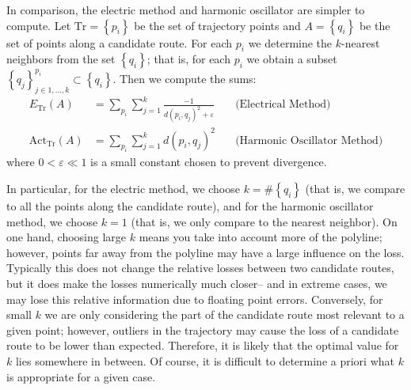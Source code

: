 \documentclass{article}
\numberwithin{equation}{section}
\theoremstyle{definition}
\newcommand{\eps}{\varepsilon} %
\begin{document}
In comparison, the electric method and harmonic oscillator are simpler to compute. Let $\textrm{Tr} = \left\{ p_i \right\}$ be the set of trajectory points and $A = \left\{q_i\right\}$ be the set of points along a candidate route. For each $p_i$ we determine the $k$-nearest neighbors from the set $\left\{q_i\right\}$; that is, for each $p_i$ we obtain a subset $\left\{q_j\right\}_{j \in 1,...,k}^{p_i} \subset \left\{ q_i \right\}$. Then we compute the sums:
\begin{align}
    E_\textrm{Tr}(A) &= \sum_{p_i} \sum_{j = 1}^k \frac{-1}{d(p_i,q_j)^2 + \eps} \quad& \text{(Electrical Method)}\\
    \textrm{Act}_\textrm{Tr} (A) &= \sum_{p_i} \sum_{j=1}^k d(p_i,q_j)^2 \quad& \text{(Harmonic Oscillator Method)}
\end{align}
where $0<\eps\ll 1$ is a small constant chosen to prevent divergence.

In particular, for the electric method, we choose $k = \# \left\{q_i\right\}$ (that is, we compare to all the points along the candidate route), and for the harmonic oscillator method, we choose $k = 1$ (that is, we only compare to the nearest neighbor). On one hand, choosing large $k$ means you take into account more of the polyline; however, points far away from the polyline may have a large influence on the loss. Typically this does not change the relative losses between two candidate routes, but it does make the losses numerically much closer-- and in extreme cases, we may lose this relative information due to floating point errors. Conversely, for small $k$ we are only considering the part of the candidate route most relevant to a given point; however, outliers in the trajectory may cause the loss of a candidate route to be lower than expected. Therefore, it is likely that the optimal value for $k$ lies somewhere in between. Of course, it is difficult to determine a priori what $k$ is appropriate for a given case.



\end{document}
